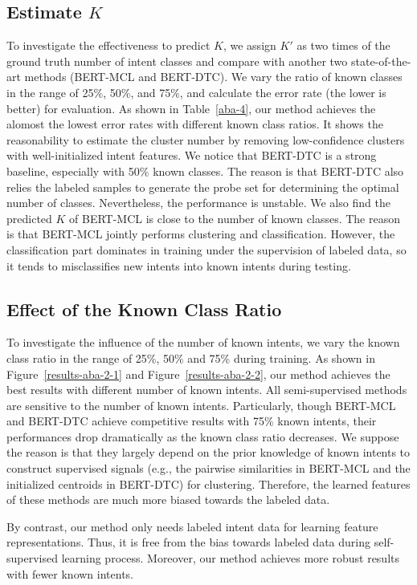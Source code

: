 \documentclass[letterpaper]{article} \usepackage{aaai21}  \usepackage{times}  \usepackage{helvet} \usepackage{courier}  \usepackage[hyphens]{url}  \usepackage{graphicx} \urlstyle{rm} \def\UrlFont{\rm}  \usepackage{natbib}  \usepackage{caption} \frenchspacing  \setlength{\pdfpagewidth}{8.5in}  \setlength{\pdfpageheight}{11in}  \usepackage{amsmath}
\begin{document}
	\subsection{Estimate $K$} 
	To investigate the effectiveness to predict $K$, we assign $K'$ as two times of the ground truth number of intent classes and compare with another two state-of-the-art methods (BERT-MCL and BERT-DTC). We vary the ratio of known classes in the range of 25\%, 50\%, and  75\%, and calculate the error rate (the lower is better) for evaluation. As shown in Table~\ref{aba-4}, our method achieves the alomost the lowest error rates with different known class ratios. It shows the reasonability to estimate the cluster number by removing low-confidence clusters with well-initialized intent features. We notice that BERT-DTC is a strong baseline, especially with 50\% known classes. The reason is that BERT-DTC also relies the labeled samples to generate the probe set for determining the optimal number of classes. Nevertheless, the performance is unstable. We also find the predicted $K$ of BERT-MCL is close to the number of known classes. The reason is that BERT-MCL jointly performs clustering and classification.  However, the classification part dominates in training under the supervision of labeled data, so it tends to misclassifies new intents into known intents during testing.
	
	\subsection{Effect of the Known Class Ratio}
	To investigate the influence of the number of known intents, we vary the known class ratio in the range of 25\%, 50\% and 75\% during training. As shown in Figure~\ref{results-aba-2-1} and Figure~\ref{results-aba-2-2}, our method achieves the best results with different number of known intents. All semi-supervised methods are sensitive to the number of known intents. Particularly, though BERT-MCL and BERT-DTC achieve competitive results with 75\% known intents, their performances drop dramatically as the known class ratio decreases. We suppose the reason is that they largely depend on the prior knowledge of known intents to construct supervised signals (e.g., the pairwise similarities in BERT-MCL and the initialized centroids in BERT-DTC) for clustering. Therefore, the learned features of these methods are much more biased towards the labeled data.
	
	By contrast, our method only needs labeled  intent data for learning feature representations. Thus, it is free from the bias towards labeled data during self-supervised learning process. Moreover, our method achieves more robust results with fewer known intents.
	
\end{document}

